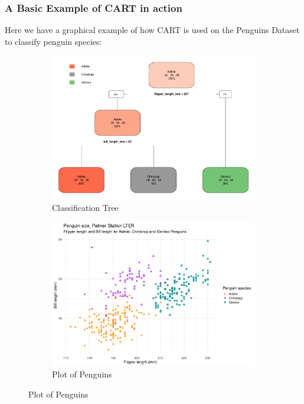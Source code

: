 \documentclass[11pt,a4paper]{report}
\begin{document}
\subsubsection{A Basic Example of CART in action}
Here we have a graphical example of how CART is used on the Penguins Dataset \cite{penguins} to classify penguin species:
\begin{figure}[H]
    \centering
    \begin{subfigure}[b]{0.4\textwidth}
        \includegraphics[width=\textwidth]{presentation/Penguintree.pdf}
        \caption{Classification Tree}
        \label{fig:pentree}
    \end{subfigure}
    \begin{subfigure}[b]{0.4\textwidth}
        \includegraphics[width=\textwidth]{presentation/plotpen.pdf}
        \caption{Plot of Penguins}
        \label{fig:plotpen}
    \end{subfigure}


\end{figure}
\end{document}
